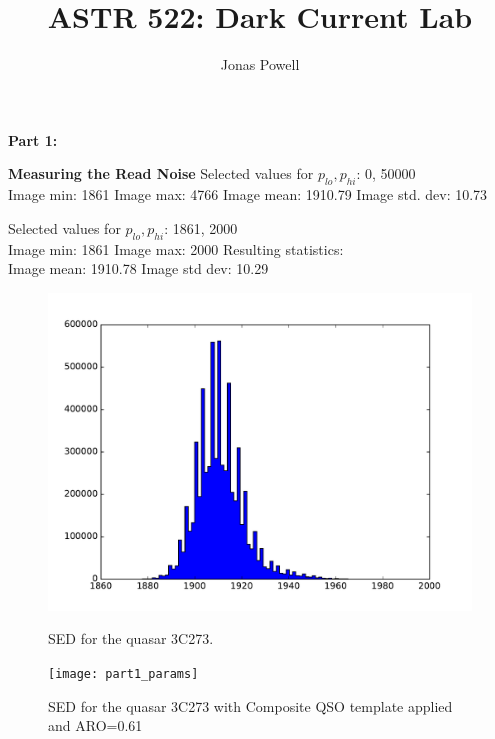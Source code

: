 \documentclass[12pt]{article}
\begin{document}
\title{\textbf{ASTR 522: Dark Current Lab}}
\author{Jonas Powell}
\maketitle


\begin{onehalfspacing}



\raggedright{\textbf{\Large Part 1:}} \\
\raggedright{\textbf{\large Measuring the Read Noise}}
Selected values for $p_{lo}, p_{hi}$: 0, 50000 \\
Image min: 1861
Image max: 4766
Image mean: 1910.79
Image std. dev: 10.73

 Selected values for $p_{lo}, p_{hi}$: 1861, 2000 \\
 Image min: 1861
 Image max: 2000
 Resulting statistics: \\
 Image mean: 1910.78
 Image std dev: 10.29

 \begin{figure}[h!]
     \centering
     \begin{minipage}{0.48\textwidth}
         \centering
         \includegraphics[width=1.05\textwidth]{part1_hist} %
         \caption{SED for the quasar 3C273.}
     \end{minipage}\hfill
     \begin{minipage}{0.48\textwidth}
         \centering
         \texttt{[image: part1\_params]} %
         \caption{SED for the quasar 3C273 with Composite QSO template applied and ARO=0.61}
     \end{minipage}\hfill
 \end{figure}



\end{onehalfspacing}
\end{document}
